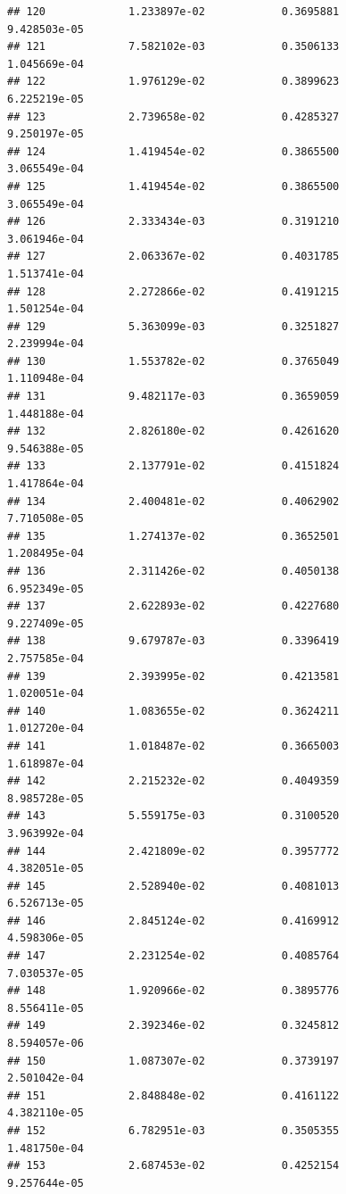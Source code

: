 \documentclass[
]{article}
\begin{document}
\begin{verbatim}
## 120             1.233897e-02            0.3695881            9.428503e-05
## 121             7.582102e-03            0.3506133            1.045669e-04
## 122             1.976129e-02            0.3899623            6.225219e-05
## 123             2.739658e-02            0.4285327            9.250197e-05
## 124             1.419454e-02            0.3865500            3.065549e-04
## 125             1.419454e-02            0.3865500            3.065549e-04
## 126             2.333434e-03            0.3191210            3.061946e-04
## 127             2.063367e-02            0.4031785            1.513741e-04
## 128             2.272866e-02            0.4191215            1.501254e-04
## 129             5.363099e-03            0.3251827            2.239994e-04
## 130             1.553782e-02            0.3765049            1.110948e-04
## 131             9.482117e-03            0.3659059            1.448188e-04
## 132             2.826180e-02            0.4261620            9.546388e-05
## 133             2.137791e-02            0.4151824            1.417864e-04
## 134             2.400481e-02            0.4062902            7.710508e-05
## 135             1.274137e-02            0.3652501            1.208495e-04
## 136             2.311426e-02            0.4050138            6.952349e-05
## 137             2.622893e-02            0.4227680            9.227409e-05
## 138             9.679787e-03            0.3396419            2.757585e-04
## 139             2.393995e-02            0.4213581            1.020051e-04
## 140             1.083655e-02            0.3624211            1.012720e-04
## 141             1.018487e-02            0.3665003            1.618987e-04
## 142             2.215232e-02            0.4049359            8.985728e-05
## 143             5.559175e-03            0.3100520            3.963992e-04
## 144             2.421809e-02            0.3957772            4.382051e-05
## 145             2.528940e-02            0.4081013            6.526713e-05
## 146             2.845124e-02            0.4169912            4.598306e-05
## 147             2.231254e-02            0.4085764            7.030537e-05
## 148             1.920966e-02            0.3895776            8.556411e-05
## 149             2.392346e-02            0.3245812            8.594057e-06
## 150             1.087307e-02            0.3739197            2.501042e-04
## 151             2.848848e-02            0.4161122            4.382110e-05
## 152             6.782951e-03            0.3505355            1.481750e-04
## 153             2.687453e-02            0.4252154            9.257644e-05

\end{verbatim}
\end{document}
